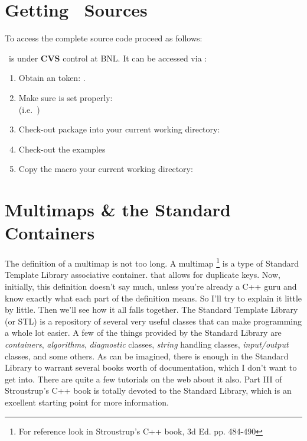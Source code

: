 
\section{Getting \StAssociationMaker\ Sources}  

To access the complete source code proceed as follows:

\StAssociationMaker\ is under {\bf CVS} control at BNL.  It can
be accessed via :   
\begin{enumerate}
  \item Obtain an  token: .
  \item Make sure  is set properly:\\ %
    (i.e.~)
  \item Check-out package into your current working directory:\\
  \item Check-out the examples
  \item Copy the macro your current working directory: \\
\end{enumerate}


\section{Multimaps \& the Standard Containers}
\label{sec:Multimaps}
The definition of a multimap is not too long.
A multimap \footnote{For reference look in Stroustrup's C++ book, 3d Ed. pp. 484-490}
is a type of Standard Template Library associative container.
that allows for duplicate keys.  Now, initially, this definition doesn't
say much, unless you're already a C++ guru and know exactly what each part of the
definition means.  So I'll try to explain it little by little.  Then we'll
see how it all falls together.
The Standard Template Library (or STL) is a repository of several very useful
classes that can make programming a whole lot easier.  A few of the things
provided by the Standard Library are \textit{containers}, \textit{algorithms},
\textit{diagnostic} classes, \textit{string} handling classes, \textit{input/output} classes, and some
others.  As can be imagined, there is enough in the
Standard Library to warrant several books worth of documentation, which I don't
want to get into.  There are quite a few tutorials on the web about it also.  Part III
of Stroustrup's C++ book is totally devoted to the Standard Library, which is an
excellent starting point for more information.


